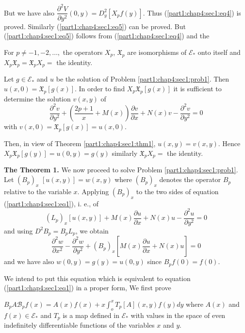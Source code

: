 But we have also $\dfrac{\partial^2 V}{\partial y^2} (0,y) = D^2 _y
[X_p f(y)]$. Thus (\ref{part1:chap4:sec1:eq4}) is proved. Similarly
(\ref{part1:chap4:sec1:eq5}) can be proved. But
(\ref{part1:chap4:sec1:eq5}) follows from (\ref{part1:chap4:sec1:eq4})
and the  
\begin{theorem}\label{part1:chap4:sec1:thm4}%
  For $p \neq -1, -2, \ldots,$ the operators $X_p$, $\mathfrak{X}_p$
  are isomorphisms of $\mathscr{E}_{*}$ onto itself and $X_p
  \mathfrak{X}_p = \mathfrak{X}_p X_p=$ the identity. 
\end{theorem}  

Let $g \in \mathscr{E}_{*}$ and $u$ be the solution of Problem
\ref{part1:chap4:sec1:prob1}. Then $u(x,0) = \mathfrak{X}_p [g(x)]$. In
order to find $X_p 
\mathfrak{X}_{p}[g(x)]$ it is sufficient to determine the solution
$v(x, y)$ of 	 
$$
\frac{\partial^2 v}{\partial y^2} + (\frac{2p+1}{x}+ M(x))
\frac{\partial  v}{\partial x} + N (x) v - \frac{\partial^2
  v}{\partial y^2}=0 
$$
with $v(x,0) = \mathfrak{X}_p [g(x)] = u(x, 0)$.
  
Then, in view of Theorem \ref{part1:chap4:sec1:thm1}, $u (x, y) = v(x,
y)$. Hence $X_p 
\mathfrak{X}_p [g(y)] = u (0, y) = g(y)$ similarly\pageoriginale
$\mathfrak{X}_p X_p = $ the identity. 
  
\noindent \textbf{The Theorem 1.} We now proceed to solve
Problem \ref{part1:chap4:sec1:prob1}. Let
$(B_p)_x$ $[u (x,y)]= w(x,y)$ where $(B_p)_x$ denotes the operator $B_p$
relative to the variable  $x$. Applying $(B_p)_x$ to the two sides of
equation (\ref{part1:chap4:sec1:eq1}), i. e.,  of 
$$
(L_p)_x [u(x,y)] + M(x) \frac{\partial u}{\partial x} + N (x) u -
\frac{\partial^2 u}{\partial y^2}=0 
$$
  and using $D^2 B_p = B_p L_p$, we obtain
  $$
  \frac{\partial^2 w}{\partial x^2}-\frac{\partial^2 w}{\partial
    y^2}+ (B_p)_x [M(x) \frac{\partial  u}{\partial x} + N(x) u] = 0 
  $$
  and we have also $w(0,y) = g(y) = u (0,y)$ since $B_p f(0) = f(0)$.
  
  We intend to put this equation which is equivalent to equation
  (\ref{part1:chap4:sec1:eq1}) in a proper form, We first prove 

\setcounter{proposition}{0}
\begin{proposition}\label{part1:chap4:sec1:prop1}%
  $B_p A \mathscr{B}_p f(x) = A(x) f(x) + x \int_{o}^{x} T_p [A] (x,y)
  f(y) dy$ where $A(x)$ and $f(x) \in \mathscr{E}_{*}$ and $T_p$ is a
  map defined in $\mathscr{E}_{*}$ with values in the space of even
  indefinitely differentiable functions of the variables $x$ and $y$. 
\end{proposition}  
  
